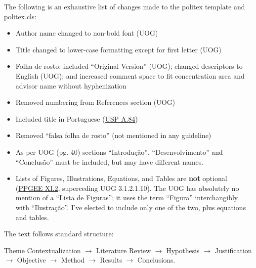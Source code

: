 \documentclass[normalnum]{politex}
\begin{document}
The following is an exhaustive list of changes made to the politex template and politex.cls:
\begin{itemize}[nolistsep,noitemsep]
  \item Author name changed to non-bold font (UOG)
  \item Title changed to lower-case formatting except for first letter (UOG)
  \item Folha de rosto: included ``Original Version'' (UOG); changed descriptors to English (UOG); and increased comment space to fit concentration area and advisor name without hyphenization
  \item Removed numbering from References section (UOG)
  \item Included title in Portuguese (\href{https://leginf.usp.br/?resolucao=resolucao-no-7493-de-27-de-marco-de-2018#:~:text=Artigo%2084}{USP A.84})
  \item Removed ``falsa folha de rosto'' (not mentioned in any guideline)
  \item As per UOG (pg. 40) sections ``Introdução'', ``Desenvolvimento'' and ``Conclusão'' must be included, but may have different names.
  \item Lists of Figures, Illustrations, Equations, and Tables are \textbf{not} optional (\href{https://leginf.usp.br/?resolucao=resolucao-copgr-no-7658-de-20-de-maio-de-2019#:~:text=XI.2,Ap%C3%AAndices}{PPGEE XI.2}, superceding UOG 3.1.2.1.10). The UOG has absolutely no mention of a ``Lista de Figuras''; it uses the term ``Figura'' interchangibly with ``Ilustração''. I've elected to include only one of the two, plus equations and tables.
\end{itemize}

The text follows standard structure:

Theme Contextualization $\rightarrow$
Literature Review $\rightarrow$
Hypothesis $\rightarrow$
Justification $\rightarrow$
Objective $\rightarrow$
Method $\rightarrow$
Results $\rightarrow$
Conclusions.

\newpage
\end{document}
